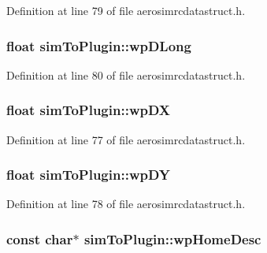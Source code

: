 \-Definition at line 79 of file aerosimrcdatastruct.\-h.

\hypertarget{group___aero_sim_r_c_gad90f5c9d9b7ad07bee47b18838d0ddd8}{
\subsubsection[{wp\-D\-Long}]{\setlength{\rightskip}{0pt plus 5cm}float {\bf sim\-To\-Plugin\-::wp\-D\-Long}}}\label{group___aero_sim_r_c_gad90f5c9d9b7ad07bee47b18838d0ddd8}


\-Definition at line 80 of file aerosimrcdatastruct.\-h.

\hypertarget{group___aero_sim_r_c_ga152da5c47fb8ddaa28e0e18015292750}{
\subsubsection[{wp\-D\-X}]{\setlength{\rightskip}{0pt plus 5cm}float {\bf sim\-To\-Plugin\-::wp\-D\-X}}}\label{group___aero_sim_r_c_ga152da5c47fb8ddaa28e0e18015292750}


\-Definition at line 77 of file aerosimrcdatastruct.\-h.

\hypertarget{group___aero_sim_r_c_ga04968f40e2545a32b4e052fe9e632504}{
\subsubsection[{wp\-D\-Y}]{\setlength{\rightskip}{0pt plus 5cm}float {\bf sim\-To\-Plugin\-::wp\-D\-Y}}}\label{group___aero_sim_r_c_ga04968f40e2545a32b4e052fe9e632504}


\-Definition at line 78 of file aerosimrcdatastruct.\-h.

\hypertarget{group___aero_sim_r_c_ga8662d58603fa2a33c7959677b0ec7783}{
\subsubsection[{wp\-Home\-Desc}]{\setlength{\rightskip}{0pt plus 5cm}const char$\ast$ {\bf sim\-To\-Plugin\-::wp\-Home\-Desc}}}\label{group___aero_sim_r_c_ga8662d58603fa2a33c7959677b0ec7783}



